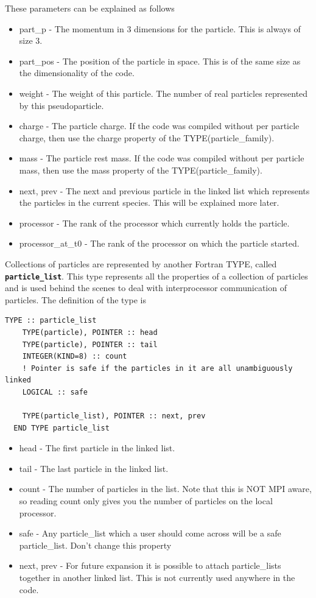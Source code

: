 \documentclass[12pt,a4paper]{article}
\newcommand{\simpleboxverbatim}{\begin{Verbatim}[obeytabs=true,frame=single,
  framerule=0.5mm,rulecolor=\color{warwickmid},formatcom=\color{black}]}
\newcommand{\inlinecode}[1]{{\color{warwickred} \bf\texttt{#1}}}
\begin{document}
These parameters can be explained as follows
\begin{itemize}
\item part\_p - The momentum in 3 dimensions for the particle. This is always
  of size 3.
\item part\_pos - The position of the particle in space. This is of the same
  size as the dimensionality of the code.
\item weight - The weight of this particle. The number of real particles
  represented by this pseudoparticle.
\item charge - The particle charge. If the code was compiled without per
  particle charge, then use the charge property of the TYPE(particle\_family).
\item mass - The particle rest mass. If the code was compiled without per
  particle mass, then use the mass property of the TYPE(particle\_family).
\item next, prev - The next and previous particle in the linked list which
  represents the particles in the current species. This will be explained more
  later.
\item processor - The rank of the processor which currently holds the
  particle.
\item processor\_at\_t0 - The rank of the processor on which the particle
  started.
\end{itemize}

Collections of particles are represented by another Fortran TYPE, called
\inlinecode{particle\_list}. This type represents all the properties of a
collection of particles and is used behind the scenes to deal with
interprocessor communication of particles. The definition of the type is

\simpleboxverbatim
  TYPE :: particle_list
    TYPE(particle), POINTER :: head
    TYPE(particle), POINTER :: tail
    INTEGER(KIND=8) :: count
    ! Pointer is safe if the particles in it are all unambiguously linked
    LOGICAL :: safe

    TYPE(particle_list), POINTER :: next, prev
  END TYPE particle_list
\end{Verbatim}
\begin{itemize}
\item head - The first particle in the linked list.
\item tail - The last particle in the linked list.
\item count - The number of particles in the list. Note that this is NOT MPI
  aware, so reading count only gives you the number of particles on the local
  processor.
\item safe - Any particle\_list which a user should come across will be a safe
  particle\_list. Don't change this property
\item next, prev - For future expansion it is possible to attach particle\_lists
  together in another linked list. This is not currently used anywhere in the
  code.
\end{itemize}
\end{document}
